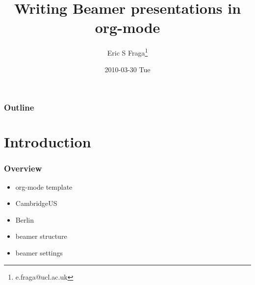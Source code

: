 \documentclass[bigger, english, 10pt, presentation]{beamer}
\title{Writing Beamer presentations in org-mode}
\author{Eric S Fraga\thanks{e.fraga@ucl.ac.uk}}
\date{2010-03-30 Tue}
\begin{document}
\maketitle

\begin{frame}
\frametitle{Outline}
\setcounter{tocdepth}{3}
\tableofcontents
\end{frame}




\section{Introduction}
\label{sec-1}
\begin{frame}
\frametitle{Overview}
\label{sec-1-1}

\begin{itemize}
\item org-mode template
\item CambridgeUS
\item Berlin
\item beamer structure
\item beamer settings
\end{itemize}
\end{frame}
\end{document}
